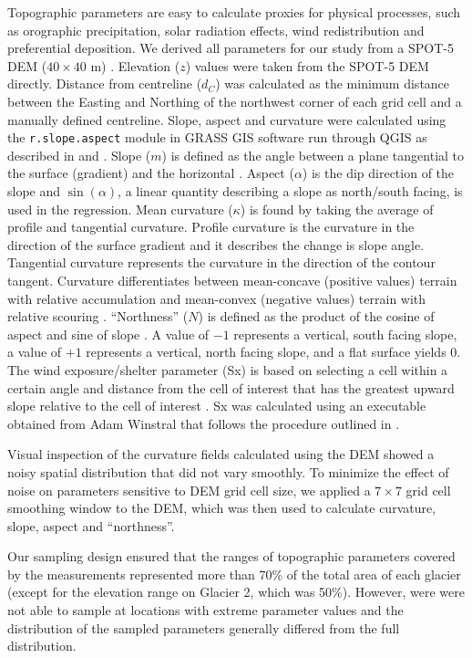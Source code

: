 \documentclass[twocolumn,letterpaper]{igs}
\begin{document}
Topographic parameters are easy to calculate proxies for physical processes, such as orographic precipitation, solar radiation effects, wind redistribution and preferential deposition. We derived all parameters for our study from a SPOT-5 DEM ($40\times40$ m) \citep{Korona2009}. Elevation ($z$) values were taken from the SPOT-5 DEM directly. Distance from centreline ($d_C$) was calculated as the minimum distance between the Easting and Northing of the northwest corner of each grid cell and a manually defined centreline. Slope, aspect and curvature were calculated using the \texttt{r.slope.aspect} module in GRASS GIS software run through QGIS as described in \cite{Mitavsova1993} and \cite{Hofierka2009}. Slope ($m$) is defined as the angle between a plane tangential to the surface (gradient) and the horizontal \citep{Olaya2009}. Aspect ($\alpha$) is the dip direction of the slope and $\sin(\alpha)$, a linear quantity describing a slope as north/south facing, is used in the regression. Mean curvature ($\kappa$) is found by taking the average of profile and tangential curvature. Profile curvature is the curvature in the direction of the surface gradient and it describes the change is slope angle. Tangential curvature represents the curvature in the direction of the contour tangent. Curvature differentiates between mean-concave (positive values) terrain with relative accumulation and mean-convex (negative values) terrain with relative scouring \citep{Olaya2009}. ``Northness'' ($N$) is defined as the product of the cosine of aspect and sine of slope \citep{Molotch2005}. A value of $-1$ represents a vertical, south facing slope, a value of $+1$ represents a vertical, north facing slope, and a flat surface yields 0. The wind exposure/shelter parameter (Sx) is based on selecting a cell within a certain angle and distance from the cell of interest that has the greatest upward slope relative to the cell of interest \citep{Winstral2002}. Sx was calculated using an executable obtained from Adam Winstral that follows the procedure outlined in \cite{Winstral2002}. 

Visual inspection of the curvature fields calculated using the DEM showed a noisy spatial
distribution that did not vary smoothly. To minimize the effect of noise on parameters sensitive to DEM grid cell size, we applied a $7\times7$ grid cell smoothing window to the DEM, which was then used to calculate curvature, slope, aspect and ``northness''.

Our sampling design ensured that the ranges of topographic parameters covered by the measurements represented more than 70\% of the total area of each glacier (except for the elevation range on Glacier 2, which was 50\%). However, were were not able to sample at locations with extreme parameter values and the distribution of the sampled parameters generally differed from the full distribution.
\end{document}

